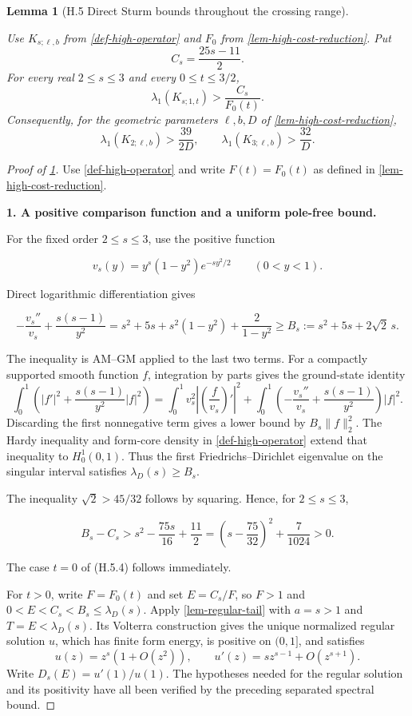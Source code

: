 \documentclass[11pt,a4paper]{article}
\theoremstyle{proofmanuscript}
\newtheorem{lemma}[theorem]{Lemma}
\begin{document}
\begin{lemma}[H.5 Direct Sturm bounds throughout the crossing range]\label{lem-crossing-sturm}

Use \(K_{s;\ell,b}\) from \ref{def-high-operator} and \(F_0\) from \ref{lem-high-cost-reduction}. Put \[
C_s=\frac{25s-11}{2}.
\] For every real \(2\le s\le3\) and every \(0\le t\le3/2\), \[
\lambda_1(K_{s;1,t})>\frac{C_s}{F_0(t)}.
\tag{H.5.4}
\] Consequently, for the geometric parameters \(\ell,b,D\) of \ref{lem-high-cost-reduction}, \[
\lambda_1(K_{2;\ell,b})>\frac{39}{2D},\qquad
\lambda_1(K_{3;\ell,b})>\frac{32}{D}.
\]

\end{lemma}

\begin{proof}[Proof of \ref{lem-crossing-sturm}]

Use \ref{def-high-operator} and write \(F(t)=F_0(t)\) as defined in \ref{lem-high-cost-reduction}.

\textbf{1. A positive comparison function and a uniform pole-free bound.}

For the fixed order \(2\le s\le3\), use the positive function

\[
v_s(y)=y^s(1-y^2)e^{-s y^2/2}\qquad(0<y<1).
\]

Direct logarithmic differentiation gives

\[
-\frac{v_s''}{v_s}+\frac{s(s-1)}{y^2}
=s^2+5s+s^2(1-y^2)+\frac{2}{1-y^2}
\ge B_s:=s^2+5s+2\sqrt2\,s.
\tag{H.5.5}
\]

The inequality is AM--GM applied to the last two terms. For a compactly supported smooth function \(f\), integration by parts gives the ground-state identity \[
\int_0^1\left(|f'|^2+\frac{s(s-1)}{y^2}|f|^2\right)
=\int_0^1v_s^2\left|\left(\frac f{v_s}\right)'\right|^2
+\int_0^1\left(-\frac{v_s''}{v_s}+\frac{s(s-1)}{y^2}\right)|f|^2.
\] Discarding the first nonnegative term gives a lower bound by \(B_s\|f\|_2^2\). The Hardy inequality and form-core density in \ref{def-high-operator} extend that inequality to \(H_0^1(0,1)\). Thus the first Friedrichs--Dirichlet eigenvalue on the singular interval satisfies \(\lambda_D(s)\ge B_s\).

The inequality \(\sqrt2>45/32\) follows by squaring. Hence, for \(2\le s\le3\),

\[
B_s-C_s>
 s^2-\frac{75s}{16}+\frac{11}{2}
=\left(s-\frac{75}{32}\right)^2+\frac7{1024}>0.
\tag{H.5.6}
\]

The case \(t=0\) of (H.5.4) follows immediately.

For \(t>0\), write \(F=F_0(t)\) and set \(E=C_s/F\), so \(F>1\) and \(0<E<C_s<B_s\le\lambda_D(s)\). Apply \ref{lem-regular-tail} with \(a=s>1\) and \(T=E<\lambda_D(s)\). Its Volterra construction gives the unique normalized regular solution \(u\), which has finite form energy, is positive on \((0,1]\), and satisfies \[
u(z)=z^s(1+O(z^2)),\qquad
u'(z)=s z^{s-1}+O(z^{s+1}).
\] Write \(D_s(E)=u'(1)/u(1)\). The hypotheses needed for the regular solution and its positivity have all been verified by the preceding separated spectral bound.


\end{proof}
\end{document}
